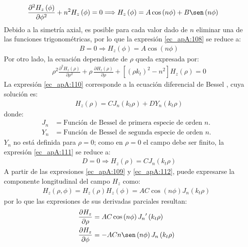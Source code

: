 \begin{align}
&\frac{\partial^2 H_z\left(\phi\right)}{\partial\phi^2} + n^2H_z\left(\phi\right) = 0\Longrightarrow H_z\left(\phi\right) = A\cos\left(n\phi\right) + B\sen\left(n\phi\right)
\label{ec_apA:108}
\end{align}
Debido a la simetría axial, es posible para cada valor dado de $n$ eliminar una de las funciones trigonométricas, por lo que la expresión \eqref{ec_apA:108} se reduce a:
\begin{align}
&B = 0\Longrightarrow H_z\left(\phi\right) = A\cos\left(n\phi\right)
\label{ec_apA:109}
\end{align}
Por otro lado, la ecuación dependiente de $\rho$ queda expresada por:
\begin{align}
&\rho^2\frac{\partial^2H_z\left(\rho\right)}{\partial\rho^2} + \rho\,\frac{\partial H_z\left(\rho\right)}{\partial\rho} + \left[\left(\rho k_t\right)^2 - n^2\right]H_z\left(\rho\right) = 0
\label{ec_apA:110}
\end{align}
La expresión \eqref{ec_apA:110} corresponde a la ecuación diferencial de Bessel \cite{walfram_bessel}, cuya solución es:
\begin{align}
&H_z\left(\rho\right) = CJ_n\left(k_t\rho\right) + DY_n\left(k_t\rho\right)
\label{ec_apA:111}
\end{align}
donde:
\begin{align*}
J_n &= \mbox{Función de Bessel de primera especie de orden $n$.}\\
Y_n &= \mbox{Función de Bessel de segunda especie de orden $n$.}
\end{align*}
$Y_n$ no está definida para $\rho = 0$; como en $\rho = 0$ el campo debe ser finito, la expresión \eqref{ec_apA:111} se reduce a:
\begin{align}
&D = 0\Longrightarrow H_z\left(\rho\right) = CJ_n\left(k_t\rho\right)
\label{ec_apA:112}
\end{align}
A partir de las expresiones \eqref{ec_apA:109} y \eqref{ec_apA:112}, puede expresarse la componente longitudinal del campo $H_z$ como:
\begin{align}
H_z\left(\rho,\phi\right) = H_z\left(\rho\right)H_z\left(\phi\right) = AC\cos\left(n\phi\right)J_n\left(k_t\rho\right)
\label{ec_apA:113}
\end{align}
por lo que las expresiones de sus derivadas parciales resultan:
\begin{subequations}
\label{grup_ec_apA:24}
\begin{align}
\frac{\partial H_z}{\partial\rho} &= AC\cos\left(n\phi\right){J_n}'\left(k_t\rho\right)
\label{ec_apA:114}\\
\frac{\partial H_z}{\partial\phi} &= -ACn\sen\left(n\phi\right)J_n\left(k_t\rho\right)
\label{ec_apA:115}
\end{align}
\end{subequations}

